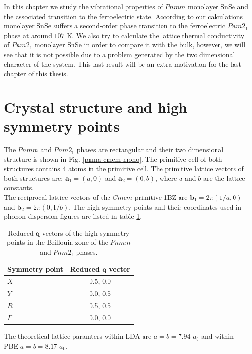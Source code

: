 In this chapter we study the vibrational properties of $Pnmm$ monolayer SnSe and the associated transition to the 
ferroelectric state. According to our calculations monolayer SnSe suffers a second-order phase transition to the 
ferroelectric $Pnm2_{1}$ phase at around $107$ K. We also try to calculate the lattice thermal conductivity of 
$Pnm2_{1}$ monolayer SnSe in order to compare it with the bulk, however, we will see that it is not possible due to 
a problem generated by the two dimensional character of the system. This last result will be an extra motivation for 
the last chapter of this thesis.

\section{Crystal structure and high symmetry points}

The $Pnmm$ and $Pnm2_{1}$ phases are rectangular and their two dimensional structure is shown in 
Fig. \ref{pnma-cmcm-mono}. The primitive cell of both structures contains 4 atoms in the primitive cell. The 
primitive lattice vectors of both structures are: $\mathbf{a}_{1}=(a,0)$ and $\mathbf{a}_{2}=(0,b)$, where $a$ and 
$b$ are the lattice constants. \\

The reciprocal lattice vectors of the $Cmcm$ primitive 1BZ are $\mathbf{b}_{1}=2\pi(1/a,0)$ and 
$\mathbf{b}_{2}=2\pi(0,1/b)$. The high symmetry points and their coordinates used in phonon dispersion figures are 
listed in table \ref{qpoints-mono}.
\begin{table}
\begin{center}
\begin{tabular*}{0.45\textwidth}{l c}
 \hline
 \hline
             Symmetry point  & Reduced $\mathbf{q}$ vector  \\
 \hline
 $X$                  &  0.5, 0.0 \\
 $Y$                  &  0.0, 0.5 \\
 $R$                  &  0.5, 0.5  \\
 $\Gamma$             &  0.0, 0.0  \\
 \hline
 \hline
\end{tabular*}
\end{center}
\caption{Reduced $\mathbf{q}$ vectors of the high symmetry points in the Brillouin zone of the $Pnmm$ and $Pnm2_{1}$ 
phases.}
\label{qpoints-mono}
\end{table}
The theoretical lattice paramters within LDA are $a=b=7.94$ $a_{0}$ and within PBE $a=b=8.17$ $a_{0}$. 

